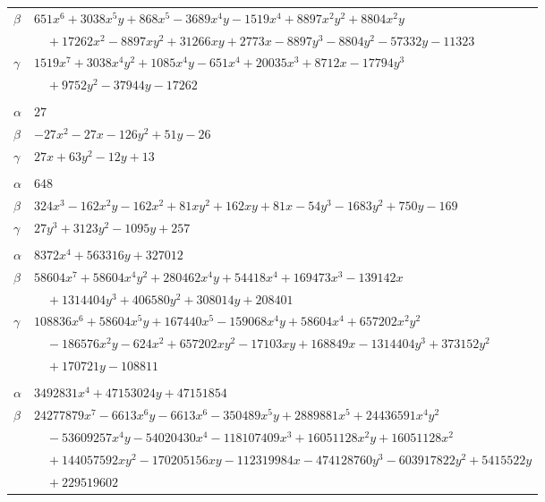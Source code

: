 \documentclass[11pt]{article}
\begin{document}
\begin{longtable}{@{}ll@{}}
$\beta$ & $651x^{6}+3038x^{5}y+868x^{5}-3689x^{4}y-1519x^{4}+8897x^{2}y^{2}+8804x^{2}y$\\
 & $\quad +17262x^{2}-8897xy^{2}+31266xy+2773x-8897y^{3}-8804y^{2}-57332y-11323$\\
$\gamma$ & $1519x^{7}+3038x^{4}y^{2}+1085x^{4}y-651x^{4}+20035x^{3}+8712x-17794y^{3}$\\
 & $\quad +9752y^{2}-37944y-17262$\\
\addlinespace[3pt]
\multicolumn{2}{@{}l}{$\{i,j\}=\{12,18\}$, $k_{ij}=2\cdot 7$}\\
$\alpha$ & $27$\\
$\beta$ & $-27x^{2}-27x-126y^{2}+51y-26$\\
$\gamma$ & $27x+63y^{2}-12y+13$\\
\addlinespace[3pt]
\multicolumn{2}{@{}l}{$\{i,j\}=\{13,15\}$, $k_{ij}=2^{4}\cdot 5\cdot 7$}\\
$\alpha$ & $648$\\
$\beta$ & $324x^{3}-162x^{2}y-162x^{2}+81xy^{2}+162xy+81x-54y^{3}-1683y^{2}+750y-169$\\
$\gamma$ & $27y^{3}+3123y^{2}-1095y+257$\\
\addlinespace[3pt]
\multicolumn{2}{@{}l}{$\{i,j\}=\{13,17\}$, $k_{ij}=2^{3}\cdot 5^{2}\cdot 7^{2}$}\\
$\alpha$ & $8372x^{4}+563316y+327012$\\
$\beta$ & $58604x^{7}+58604x^{4}y^{2}+280462x^{4}y+54418x^{4}+169473x^{3}-139142x$\\
 & $\quad +1314404y^{3}+406580y^{2}+308014y+208401$\\
$\gamma$ & $108836x^{6}+58604x^{5}y+167440x^{5}-159068x^{4}y+58604x^{4}+657202x^{2}y^{2}$\\
 & $\quad -186576x^{2}y-624x^{2}+657202xy^{2}-17103xy+168849x-1314404y^{3}+373152y^{2}$\\
 & $\quad +170721y-108811$\\
\addlinespace[3pt]
\multicolumn{2}{@{}l}{$\{i,j\}=\{13,20\}$, $k_{ij}=2^{2}\cdot 3^{3}\cdot 5\cdot 13$}\\
$\alpha$ & $3492831x^{4}+47153024y+47151854$\\
$\beta$ & $24277879x^{7}-6613x^{6}y-6613x^{6}-350489x^{5}y+2889881x^{5}+24436591x^{4}y^{2}$\\
 & $\quad -53609257x^{4}y-54020430x^{4}-118107409x^{3}+16051128x^{2}y+16051128x^{2}$\\
 & $\quad +144057592xy^{2}-170205156xy-112319984x-474128760y^{3}-603917822y^{2}+5415522y$\\
 & $\quad +229519602$\\

\end{longtable}
\end{document}
